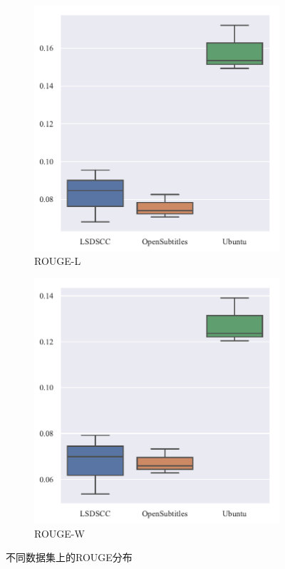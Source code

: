 \begin{figure}[H]
    \begin{subfigure}{0.5\linewidth}
        \centering
        \includegraphics[width=\linewidth]{figure/boxplot/dataset/rouge_l/plot.pdf}
        \caption{ROUGE-L}
    \end{subfigure}%
    \begin{subfigure}{0.5\linewidth}
        \centering
        \includegraphics[width=\linewidth]{figure/boxplot/dataset/rouge_w/plot.pdf}
        \caption{ROUGE-W}
    \end{subfigure}
    \centering
    \caption{不同数据集上的ROUGE分布}
    \label{fig:ROUGE_LW_dataset}
\end{figure}

